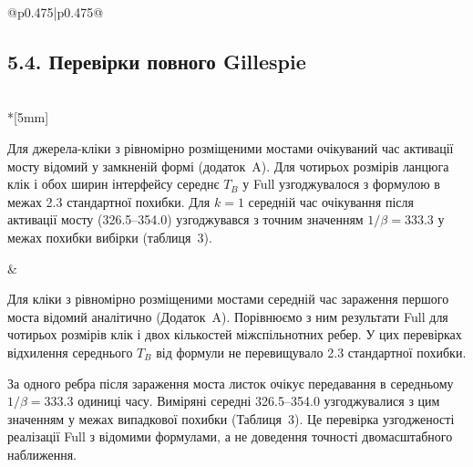 \documentclass[11pt]{article}
\newcommand{\Full}{\textnormal{Full}}
\begin{document}
\begin{longtable}{@{}p{0.475\textwidth}|p{0.475\textwidth}@{}}
\begin{minipage}[t]{\linewidth}
\subsection*{5.4. Перевірки повного Gillespie}
\end{minipage} \\*[5mm]
\begin{minipage}[t]{\linewidth}
Для джерела-кліки з рівномірно розміщеними мостами очікуваний час активації мосту відомий у замкненій формі (додаток~A). Для чотирьох розмірів ланцюга клік і обох ширин інтерфейсу середнє $T_B$ у \Full{} узгоджувалося з формулою в межах 2.3 стандартної похибки. Для $k=1$ середній час очікування після активації мосту (326.5--354.0) узгоджувався з точним значенням $1/\beta=333.3$ у межах похибки вибірки (таблиця~3).
\end{minipage} &
\begin{minipage}[t]{\linewidth}
Для кліки з рівномірно розміщеними мостами середній час зараження першого моста відомий аналітично (Додаток~A). Порівнюємо з ним результати \Full{} для чотирьох розмірів клік і двох кількостей міжспільнотних ребер. У цих перевірках відхилення середнього $T_B$ від формули не перевищувало 2.3 стандартної похибки.
\par За одного ребра після зараження моста листок очікує передавання в середньому $1/\beta=333.3$ одиниці часу. Виміряні середні 326.5--354.0 узгоджувалися з цим значенням у межах випадкової похибки (Таблиця~3). Це перевірка узгодженості реалізації \Full{} з відомими формулами, а не доведення точності двомасштабного наближення.
\end{minipage} \\[5mm]
\end{longtable}
\clearpage
\end{document}
